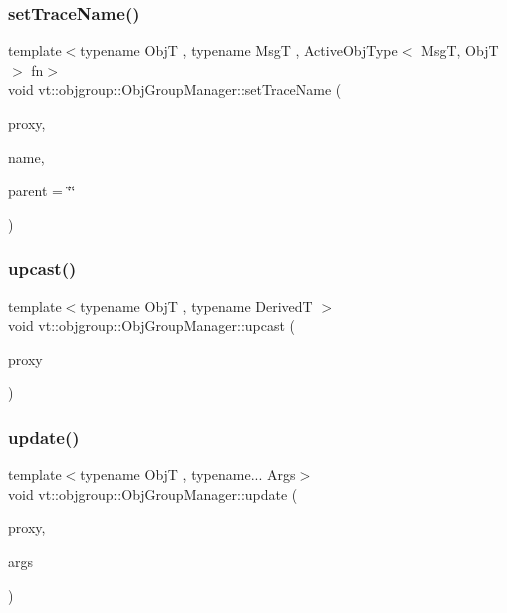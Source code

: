 \subsubsection{\texorpdfstring{set\+Trace\+Name()}{setTraceName()}}
{\footnotesize\ttfamily template$<$typename ObjT , typename MsgT , Active\+Obj\+Type$<$ Msg\+T, Obj\+T $>$ fn$>$ \\
void vt\+::objgroup\+::\+Obj\+Group\+Manager\+::set\+Trace\+Name (\begin{DoxyParamCaption}\item[{\hyperlink{structvt_1_1objgroup_1_1_obj_group_manager_aea65eef52f240a52210132eef5ce591f}{Proxy\+Type}$<$ ObjT $>$}]{proxy,  }\item[{std\+::string const \&}]{name,  }\item[{std\+::string const \&}]{parent = {\ttfamily \char`\"{}\char`\"{}} }\end{DoxyParamCaption})}

\mbox{\label{structvt_1_1objgroup_1_1_obj_group_manager_abddd0f80c5b0f625a4ed487414c3b39b}} 
\subsubsection{\texorpdfstring{upcast()}{upcast()}}
{\footnotesize\ttfamily template$<$typename ObjT , typename DerivedT $>$ \\
void vt\+::objgroup\+::\+Obj\+Group\+Manager\+::upcast (\begin{DoxyParamCaption}\item[{\hyperlink{structvt_1_1objgroup_1_1_obj_group_manager_aea65eef52f240a52210132eef5ce591f}{Proxy\+Type}$<$ ObjT $>$}]{proxy }\end{DoxyParamCaption})}

\mbox{\label{structvt_1_1objgroup_1_1_obj_group_manager_abd0f61b0578a268a27420f2c38e3b12d}} 
\subsubsection{\texorpdfstring{update()}{update()}\hspace{0.1cm}{\footnotesize\ttfamily [1/2]}}
{\footnotesize\ttfamily template$<$typename ObjT , typename... Args$>$ \\
void vt\+::objgroup\+::\+Obj\+Group\+Manager\+::update (\begin{DoxyParamCaption}\item[{\hyperlink{structvt_1_1objgroup_1_1_obj_group_manager_adba6c8ecb0f4c30e719f1abb995cfc9b}{Proxy\+Elm\+Type}$<$ ObjT $>$}]{proxy,  }\item[{Args \&\&...}]{args }\end{DoxyParamCaption})}

